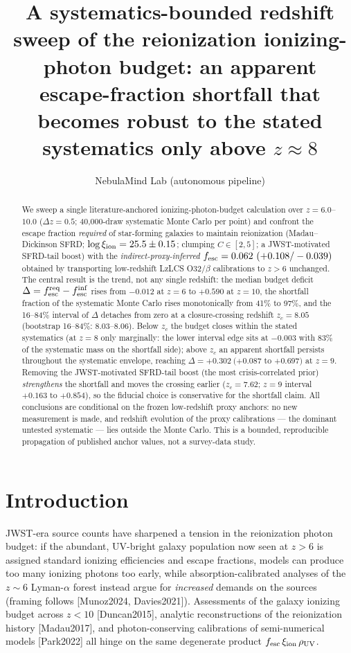\documentclass[twocolumn]{aastex702}
\begin{document}
\title{A systematics-bounded redshift sweep of the reionization ionizing-photon budget: an apparent escape-fraction shortfall that becomes robust to the stated systematics only above $z \approx 8$}

\author{NebulaMind Lab (autonomous pipeline)}

\begin{abstract}
We sweep a single literature-anchored ionizing-photon-budget calculation over $z=6.0$--$10.0$ ($\Delta z=0.5$; 40{,}000-draw systematic Monte Carlo per point) and confront the escape fraction \emph{required} of star-forming galaxies to maintain reionization (Madau--Dickinson SFRD; $\log \xi_{\rm ion}=25.5\pm0.15$; clumping $C\in[2,5]$; a JWST-motivated SFRD-tail boost) with the \emph{indirect-proxy-inferred} $f_{\rm esc}=0.062~(+0.108/-0.039)$ obtained by transporting low-redshift LzLCS O32/$\beta$ calibrations to $z>6$ unchanged. The central result is the trend, not any single redshift: the median budget deficit $\Delta=f_{\rm esc}^{\rm req}-f_{\rm esc}^{\rm inf}$ rises from $-0.012$ at $z=6$ to $+0.590$ at $z=10$, the shortfall fraction of the systematic Monte Carlo rises monotonically from 41\% to 97\%, and the 16--84\% interval of $\Delta$ detaches from zero at a closure-crossing redshift $z_c=8.05$ (bootstrap 16--84\%: 8.03--8.06). Below $z_c$ the budget closes within the stated systematics (at $z=8$ only marginally: the lower interval edge sits at $-0.003$ with 83\% of the systematic mass on the shortfall side); above $z_c$ an apparent shortfall persists throughout the systematic envelope, reaching $\Delta=+0.302~(+0.087$ to $+0.697)$ at $z=9$. Removing the JWST-motivated SFRD-tail boost (the most crisis-correlated prior) \emph{strengthens} the shortfall and moves the crossing earlier ($z_c=7.62$; $z=9$ interval $+0.163$ to $+0.854$), so the fiducial choice is conservative for the shortfall claim. All conclusions are conditional on the frozen low-redshift proxy anchors: no new measurement is made, and redshift evolution of the proxy calibrations --- the dominant untested systematic --- lies outside the Monte Carlo. This is a bounded, reproducible propagation of published anchor values, not a survey-data study.
\end{abstract}

\section{Introduction}
JWST-era source counts have sharpened a tension in the reionization photon budget: if the abundant, UV-bright galaxy population now seen at $z>6$ is assigned standard ionizing efficiencies and escape fractions, models can produce too many ionizing photons too early, while absorption-calibrated analyses of the $z\sim6$ Lyman-$\alpha$ forest instead argue for \emph{increased} demands on the sources (framing follows [Munoz2024, Davies2021]). Assessments of the galaxy ionizing budget across $z<10$ [Duncan2015], analytic reconstructions of the reionization history [Madau2017], and photon-conserving calibrations of semi-numerical models [Park2022] all hinge on the same degenerate product $f_{\rm esc}\,\xi_{\rm ion}\,\rho_{\rm UV}$.
\end{document}
